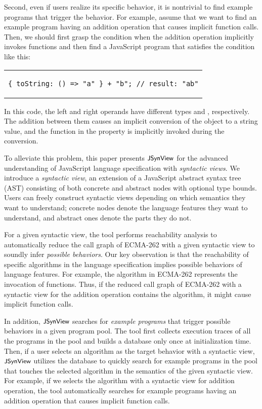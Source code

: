 Second, even if users realize its specific behavior, it is nontrivial to find
example programs that trigger the behavior.  For example, assume that we want to
find an example program having an addition operation that causes implicit
function calls.  Then, we should first grasp the condition when the addition
operation implicitly invokes functions and then find a JavaScript program that
satisfies the condition like this:
\begin{center}
  \begin{tabular}{c}
    \begin{lstlisting}[style=JS]
{ toString: () => "a" } + "b"; // result: "ab"
    \end{lstlisting}
  \end{tabular}
\end{center}
In this code, the left and right operands have different types 
and , respectively.  The addition between them causes an implicit
conversion of the object to a string value, and the function in the
 property is implicitly invoked during the conversion.

To alleviate this problem, this paper presents $\textsf{\small JSynView}$ for the advanced
understanding of JavaScript language specification with \textit{syntactic
views}.  We introduce a \textit{syntactic view}, an extension of a JavaScript
abstract syntax tree (AST) consisting of both concrete and abstract nodes with
optional type bounds.  Users can freely construct syntactic views depending on
which semantics they want to understand; concrete nodes denote the language
features they want to understand, and abstract ones denote the parts they do
not.

For a given syntactic view, the tool performs reachability analysis to
automatically reduce the call graph of ECMA-262 with a given syntactic view to
soundly infer \textit{possible behaviors}.  Our key observation is that the
reachability of specific algorithms in the language specification implies
possible behaviors of language features.  For example, the 
algorithm in ECMA-262 represents the invocation of functions.  Thus, if the
reduced call graph of ECMA-262 with a syntactic view for the addition operation
contains the  algorithm, it might cause implicit function calls.

In addition, $\textsf{\small JSynView}$ searches for \textit{example programs} that trigger
possible behaviors in a given program pool.  The tool first collects execution
traces of all the programs in the pool and builds a database only once at
initialization time.  Then, if a user selects an algorithm as the target
behavior with a syntactic view, $\textsf{\small JSynView}$ utilizes the database to quickly search for
example programs in the pool that touches the selected algorithm in the
semantics of the given syntactic view.  For example, if we selects the
 algorithm with a syntactic view for addition operation, the tool
automatically searches for example programs having an addition operation that
causes implicit function calls.

